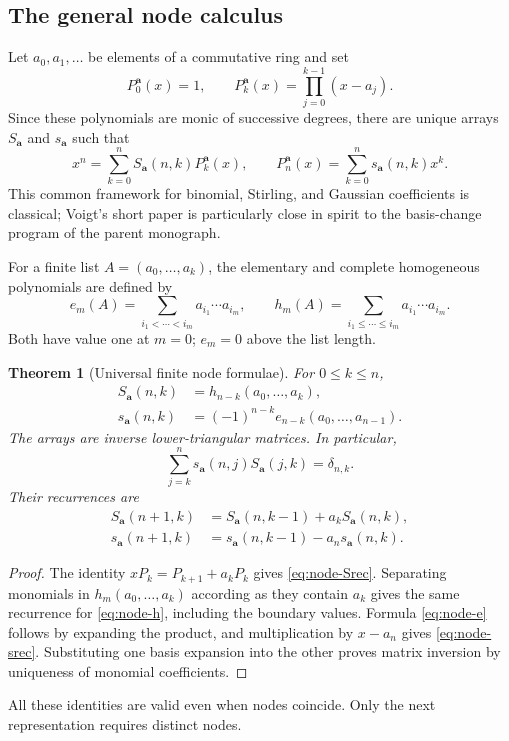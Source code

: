 \documentclass[11pt,a4paper]{article}
\numberwithin{equation}{section}
\newtheorem{theorem}{Theorem}[section]
\theoremstyle{definition}
\theoremstyle{remark}
\begin{document}
\subsection{The general node calculus}
Let $a_0,a_1,\ldots$ be elements of a commutative ring and set
\begin{equation}
 P_0^{\boldsymbol a}(x)=1,\qquad
 P_k^{\boldsymbol a}(x)=\prod_{j=0}^{k-1}(x-a_j).
 \label{eq:node-basis}
\end{equation}
Since these polynomials are monic of successive degrees, there are unique
arrays $S_{\boldsymbol a}$ and $s_{\boldsymbol a}$ such that
\begin{equation}
 x^n=\sum_{k=0}^nS_{\boldsymbol a}(n,k)P_k^{\boldsymbol a}(x),\qquad
 P_n^{\boldsymbol a}(x)=\sum_{k=0}^ns_{\boldsymbol a}(n,k)x^k.
 \label{eq:node-connections}
\end{equation}
This common framework for binomial, Stirling, and Gaussian coefficients
is classical; Voigt's short paper \cite{voigt} is particularly close in
spirit to the basis-change program of the parent monograph.

For a finite list $A=(a_0,\ldots,a_k)$, the elementary and complete
homogeneous polynomials are defined by
\[
 e_m(A)=\sum_{i_1<\cdots<i_m}a_{i_1}\cdots a_{i_m},\qquad
 h_m(A)=\sum_{i_1\le\cdots\le i_m}a_{i_1}\cdots a_{i_m}.
\]
Both have value one at $m=0$; $e_m=0$ above the list length.

\begin{theorem}[Universal finite node formulae]
\label{thm:node}
For $0\le k\le n$,
\begin{align}
 S_{\boldsymbol a}(n,k)&=h_{n-k}(a_0,\ldots,a_k),
 \label{eq:node-h}\\
 s_{\boldsymbol a}(n,k)&=(-1)^{n-k}e_{n-k}(a_0,\ldots,a_{n-1}).
 \label{eq:node-e}
\end{align}
The arrays are inverse lower-triangular matrices. In particular,
\begin{equation}
 \sum_{j=k}^ns_{\boldsymbol a}(n,j)S_{\boldsymbol a}(j,k)=\delta_{n,k}.
 \label{eq:node-inverse}
\end{equation}
Their recurrences are
\begin{align}
 S_{\boldsymbol a}(n+1,k)&=S_{\boldsymbol a}(n,k-1)+a_kS_{\boldsymbol a}(n,k),
 \label{eq:node-Srec}\\
 s_{\boldsymbol a}(n+1,k)&=s_{\boldsymbol a}(n,k-1)-a_ns_{\boldsymbol a}(n,k).
 \label{eq:node-srec}
\end{align}
\end{theorem}
\begin{proof}
The identity $xP_k=P_{k+1}+a_kP_k$ gives
\cref{eq:node-Srec}. Separating monomials in $h_m(a_0,\ldots,a_k)$
according as they contain $a_k$ gives the same recurrence for
\cref{eq:node-h}, including the boundary values. Formula
\cref{eq:node-e} follows by expanding the product, and multiplication by
$x-a_n$ gives \cref{eq:node-srec}. Substituting one basis expansion into
the other proves matrix inversion by uniqueness of monomial coefficients.
\end{proof}
All these identities are valid even when nodes coincide. Only the next
representation requires distinct nodes.
\end{document}
